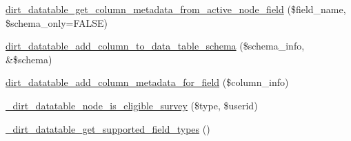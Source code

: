 \begin{DoxyCompactItemize}
\item 
\mbox{\hyperlink{dirt__datatable_8module_a76e7c95dbdc9c29ce2108bb34ae64604}{dirt\+\_\+datatable\+\_\+get\+\_\+column\+\_\+metadata\+\_\+from\+\_\+active\+\_\+node\+\_\+field}} (\$field\+\_\+name, \$schema\+\_\+only=F\+A\+L\+SE)
\item 
\mbox{\hyperlink{dirt__datatable_8module_ae8c7077a1381e164963200b5cd0e7a1c}{dirt\+\_\+datatable\+\_\+add\+\_\+column\+\_\+to\+\_\+data\+\_\+table\+\_\+schema}} (\$schema\+\_\+info, \&\$schema)
\item 
\mbox{\hyperlink{dirt__datatable_8module_a7a6ec0b5a56373d83bab71bb860c9203}{dirt\+\_\+datatable\+\_\+add\+\_\+column\+\_\+metadata\+\_\+for\+\_\+field}} (\$column\+\_\+info)
\item 
\mbox{\hyperlink{dirt__datatable_8module_aa0d706e89312781299cf125861f932a4}{\+\_\+dirt\+\_\+datatable\+\_\+node\+\_\+is\+\_\+eligible\+\_\+survey}} (\$type, \$userid)
\item 
\mbox{\hyperlink{dirt__datatable_8module_a1410f3623ba86e7d818b0a78d4a27ed3}{\+\_\+dirt\+\_\+datatable\+\_\+get\+\_\+supported\+\_\+field\+\_\+types}} ()
\end{DoxyCompactItemize}
